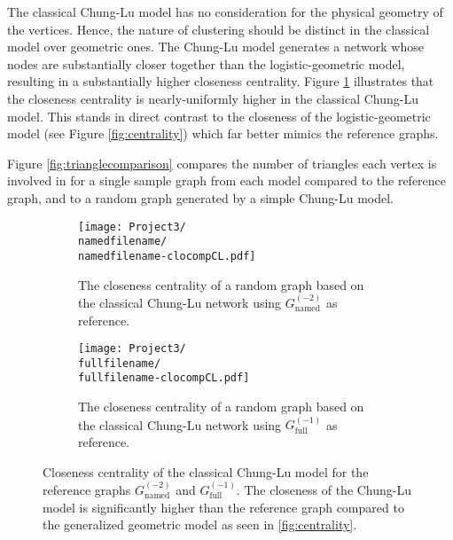 \documentclass[11]{article}
\newcommand{\namedfilename}{namedminus2-2p}
\newcommand{\fullfilename}{fullminus1-2p}
\newcommand{\namedtwo}{G_{\textrm{named}}^{(-2)}}
\newcommand{\fullone}{G_{\textrm{full}}^{(-1)}}
\theoremstyle{remark}
\theoremstyle{definition}
\begin{document}
 The classical Chung-Lu model has no consideration for the physical geometry of the vertices. Hence, the nature of clustering should be distinct in the classical model over geometric ones. The Chung-Lu model generates a network whose nodes are substantially closer together than the logistic-geometric model, resulting in a substantially higher closeness centrality. Figure \ref{fig:closenesscomparison} illustrates that the closeness centrality is nearly-uniformly higher in the classical Chung-Lu model. This stands in direct contrast to the closeness of the logistic-geometric model (see Figure \ref{fig:centrality}) which far better mimics the reference graphs. 

Figure \ref{fig:trianglecomparison} compares the number of triangles each vertex is involved in for a single sample graph from each model compared to the reference graph, and to a random graph generated by a simple Chung-Lu model. 

\begin{figure} [h!]
  \centering
    \begin{subfigure}[t]{0.4\linewidth}
    \texttt{[image: Project3/\\namedfilename/\\namedfilename-clocompCL.pdf]}
    \caption{The closeness centrality of a random graph based on the classical Chung-Lu network using $\namedtwo$ as reference.} 
    \end{subfigure} \hfill
    \begin{subfigure}[t]{0.4\linewidth}
    \texttt{[image: Project3/\\fullfilename/\\fullfilename-clocompCL.pdf]}
    \caption{The closeness centrality of a random graph based on the classical Chung-Lu network using $\fullone$ as reference.} 
    \end{subfigure} \hfill
  \caption{Closeness centrality of the classical Chung-Lu model for the reference graphs $\namedtwo$ and $\fullone$. The closeness of the Chung-Lu model is significantly higher than the reference graph compared to the generalized geometric model as seen in \ref{fig:centrality}.}
    \label{fig:closenesscomparison}
\end{figure}
  
\end{document}
